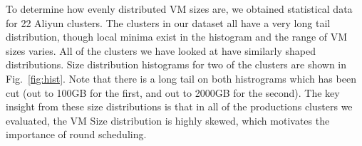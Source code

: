 To determine how evenly distributed VM sizes are, we obtained statistical data
for 22 Aliyun clusters. The clusters in our dataset all have a very long tail
distribution, though local minima exist in the histogram and the range of VM
sizes varies.
All of the clusters we have looked at have similarly shaped distributions. Size
distribution histograms for two of the clusters are shown in
Fig.~\ref{fig:hist}. Note that there is a long tail on both histrograms which has been
cut (out to 100GB for the first, and out to 2000GB for the second). The
key insight from these size distributions is that in all of the productions
clusters we evaluated, the VM Size distribution is highly skewed, which
motivates the importance of round scheduling.


